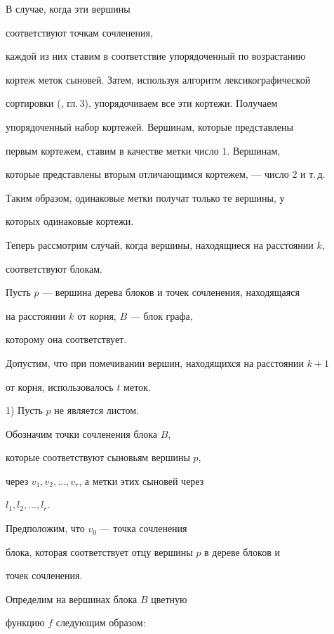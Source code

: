 В случае, когда эти вершины


соответствуют точкам сочленения,


каждой из них ставим в соответствие упорядоченный по возрастанию


кортеж меток сыновей. Затем, используя алгоритм лексикографической


сортировки (\cite{Aho}, гл.\,3), упорядочиваем все эти кортежи. Получаем


упорядоченный набор кортежей. Вершинам, которые представлены


первым кортежем, ставим в качестве метки число $1$. Вершинам,


которые представлены вторым отличающимся кортежем, --- число $2$ и т.\,д.


Таким образом, одинаковые метки получат только те вершины, у


которых одинаковые кортежи.





Теперь рассмотрим случай, когда вершины, находящиеся на расстоянии $k$,


соответствуют блокам.


Пусть $p$ --- вершина дерева блоков и точек сочленения, находящаяся


на расстоянии $k$ от корня, $B$ --- блок графа,


которому она соответствует.


Допустим, что при помечивании вершин, находящихся на расстоянии $k+1$


от корня, использовалось $t$ меток.





1) Пусть $p$ не является листом.


Обозначим точки сочленения блока $B$,


которые соответствуют сыновьям вершины $p$,


через $v_1, v_2,\dotsc, v_r$, а метки этих сыновей через


$l_1, l_2,\dotsc, l_r$.


Предположим, что $v_0$ --- точка сочленения


блока, которая соответствует отцу вершины $p$ в дереве блоков и


точек сочленения.


Определим на вершинах блока $B$ цветную


функцию $f$ следующим образом:


$$


